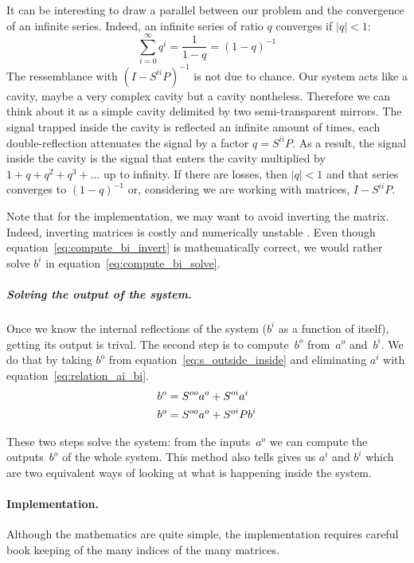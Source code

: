 It can be interesting to draw a parallel between our problem and the convergence of an infinite series.
Indeed, an infinite series of ratio $q$ converges if $\vert q \vert < 1$:
\begin{equation}
    \sum_{i=0}^\infty q^i = \frac{1}{1-q} = (1-q)^{-1}
\end{equation}
The ressemblance with $(I - S^{ii}P)^{-1}$ is not due to chance.
Our system acts like a cavity, maybe a very complex cavity but a cavity nontheless.
Therefore we can think about it as a simple cavity delimited by two semi-transparent mirrors.
The signal trapped inside the cavity is reflected an infinite amount of times, each double-reflection attenuates the signal by a factor $q=S^{ii}P$.
As a result, the signal inside the cavity is the signal that enters the cavity multiplied by $1+q+q^2+q^3+\dots$ up to infinity.
If there are losses, then $|q|<1$ and that series converges to $(1-q)^{-1}$ or, considering we are working with matrices, $I - S^{ii}P$.

Note that for the implementation, we may want to avoid inverting the matrix.
Indeed, inverting matrices is costly and numerically unstable .
Even though equation~\eqref{eq:compute_bi_invert} is mathematically correct, we would rather solve $b^i$ in equation~\eqref{eq:compute_bi_solve}.

\subparagraph{Solving the output of the system.}
Once we know the internal reflections of the system ($b^i$ as a function of itself), getting its output is trival.
The second step is to compute~$b^o$ from~$a^o$ and~$b^i$.
We do that by taking $b^o$ from equation~\eqref{eq:s_outside_inside} and eliminating $a^i$ with equation~\eqref{eq:relation_ai_bi}.
\begin{align}
    b^o &= S^{oo}a^o + S^{oi}a^i \notag \\
    b^o &= S^{oo}a^o + S^{oi}Pb^i \label{eq:compute_bo}
\end{align}

These two steps solve the system: from the inputs~$a^o$ we can compute the outputs~$b^o$ of the whole system.
This method also tells gives us $a^i$ and $b^i$ which are two equivalent ways of looking at what is happening inside the system.

\paragraph{Implementation.}
Although the mathematics are quite simple, the implementation requires careful book keeping of the many indices of the many matrices.

